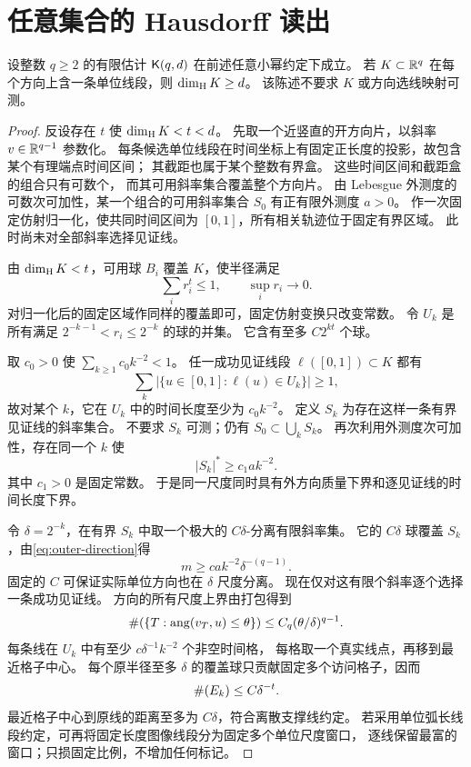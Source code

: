 \section{任意集合的 Hausdorff 读出}\label{sec:hausdorff}

\begin{lemma}[有限估计到任意集合]\label{lem:hausdorff}
设整数 $q\ge2$ 的有限估计 $\mathsf K(q,d)$ 在前述任意小幂约定下成立。
若 $K\subset\mathbb R^q$ 在每个方向上含一条单位线段，则 $\operatorname{dim}_{\mathrm H} K\ge d$。
该陈述不要求 $K$ 或方向选线映射可测。
\end{lemma}

\begin{proof}
反设存在 $t$ 使 $\operatorname{dim}_{\mathrm H} K<t<d$。
先取一个近竖直的开方向片，以斜率 $v\in\mathbb R^{q-1}$ 参数化。
每条候选单位线段在时间坐标上有固定正长度的投影，故包含某个有理端点时间区间；
其截距也属于某个整数有界盒。
这些时间区间和截距盒的组合只有可数个，
而其可用斜率集合覆盖整个方向片。
由 Lebesgue 外测度的可数次可加性，某一个组合的可用斜率集合 $S_0$
有正有限外测度 $a>0$。
作一次固定仿射归一化，使共同时间区间为 $[0,1]$，所有相关轨迹位于固定有界区域。
此时尚未对全部斜率选择见证线。

由 $\operatorname{dim}_{\mathrm H} K<t$，可用球 $B_i$ 覆盖 $K$，使半径满足
\begin{equation}\label{eq:hausdorff-cover}
 \sum_i r_i^t\le1,\qquad\sup_i r_i\longrightarrow0.
\end{equation}
对归一化后的固定区域作同样的覆盖即可，固定仿射变换只改变常数。
令 $U_k$ 是所有满足 $2^{-k-1}<r_i\le2^{-k}$ 的球的并集。
它含有至多 $C2^{kt}$ 个球。

取 $c_0>0$ 使 $\sum_{k\ge1}c_0k^{-2}<1$。
任一成功见证线段 $\ell([0,1])\subset K$ 都有
\[
 \sum_k\big|\{u\in[0,1]:\ell(u)\in U_k\}\big|\ge1,
\]
故对某个 $k$，它在 $U_k$ 中的时间长度至少为 $c_0k^{-2}$。
定义 $S_k$ 为存在这样一条有界见证线的斜率集合。
不要求 $S_k$ 可测；仍有 $S_0\subset\bigcup_kS_k$。
再次利用外测度次可加性，存在同一个 $k$ 使
\begin{equation}\label{eq:outer-direction}
 |S_k|^*\ge c_1 a k^{-2}.
\end{equation}
其中 $c_1>0$ 是固定常数。
于是同一尺度同时具有外方向质量下界和逐见证线的时间长度下界。

令 $\delta=2^{-k}$，在有界 $S_k$ 中取一个极大的 $C\delta$-分离有限斜率集。
它的 $C\delta$ 球覆盖 $S_k$，由\eqref{eq:outer-direction}得
\begin{equation}\label{eq:finite-witness-count}
 m\ge c a k^{-2}\delta^{-(q-1)}.
\end{equation}
固定的 $C$ 可保证实际单位方向也在 $\delta$ 尺度分离。
现在仅对这有限个斜率逐个选择一条成功见证线。
方向的所有尺度上界由打包得到
\[
 \#\!\left(\{T:\operatorname{ang}(v_T,u)\le\theta\}\right)
 \le C_q(\theta/\delta)^{q-1}.
\]
每条线在 $U_k$ 中有至少 $c\delta^{-1}k^{-2}$ 个非空时间格，
每格取一个真实线点，再移到最近格子中心。
每个原半径至多 $\delta$ 的覆盖球只贡献固定多个访问格子，因而
\begin{equation}\label{eq:cover-upper}
 \#\!\left(E_k\right)\le C\delta^{-t}.
\end{equation}
最近格子中心到原线的距离至多为 $C\delta$，符合离散支撑线约定。
若采用单位弧长线段约定，可再将固定长度图像线段分为固定多个单位尺度窗口，
逐线保留最富的窗口；只损固定比例，不增加任何标记。


\end{proof}
